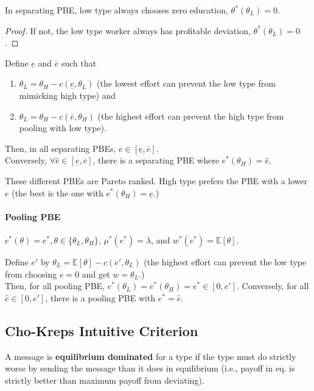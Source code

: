 \documentclass[11pt]{elegantbook_2}
\begin{document}
\begin{lemma}
    In separating PBE, low type always chooses zero education, $\theta^*(\theta_L)=0$.
\end{lemma}
\begin{proof}
    If not, the low type worker always has profitable deviation, $\theta^*(\theta_L)=0$.
\end{proof}

\begin{lemma}
    Define $\underline{e}$ and $\overline{e}$ such that
    \begin{enumerate}
        \item $\theta_L=\theta_H-c(\underline{e},\theta_L)$ (the lowest effort can prevent the low type from mimicking high type) and
        \item $\theta_L=\theta_H-c(\overline{e},\theta_H)$ (the highest effort can prevent the high type from pooling with low type).
    \end{enumerate}
    Then, in all separating PBEs, $e\in \left[\underline{e},\overline{e}\right]$.\\
    Conversely, $\forall \hat{e}\in \left[\underline{e},\overline{e}\right]$, there is a separating PBE where $e^*(\theta_H)=\hat{e}$.
\end{lemma}
These different PBEs are Pareto ranked. High type prefers the PBE with a lower $e$ (the best is the one with $e^*(\theta_H)=\underline{e}$.)

\paragraph*{Pooling PBE}
$e^*(\theta)=e^*,\theta\in\{\theta_L,\theta_H\}$, $\mu^*(e^*)=\lambda$, and $w^*(e^*)=\mathbb{E}[\theta]$.

\begin{lemma}
    Define $e'$ by $\theta_L=\mathbb{E}[\theta]-c(e',\theta_L)$ (the highest effort can prevent the low type from choosing $e=0$ and get $w=\theta_L$.)\\
    Then, for all pooling PBE, $e^*(\theta_L)=e^*(\theta_H)=e^*\in[0,e']$. Conversely, for all $\hat{e}\in [0,e']$, there is a pooling PBE with $e^*=\hat{e}$.
\end{lemma}


\subsection{Cho-Kreps Intuitive Criterion}
\begin{definition}
    A message is \textbf{equilibrium dominated} for a type if the type must do strictly worse by sending the message than it does in equilibrium (i.e., payoff in eq. is strictly better than maximum payoff from deviating).
\end{definition}
\end{document}
